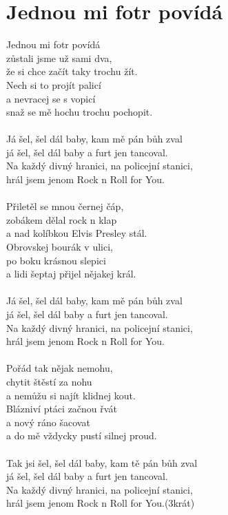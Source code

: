 \section{Jednou mi fotr povídá}
Jednou mi fotr povídá\\
zůstali jsme už sami dva,\\
že si chce začít taky trochu žít.\\
Nech si to projít palicí\\
a nevracej se s vopicí\\
snaž se mě hochu trochu pochopit.\\
\\
Já šel, šel dál baby, kam mě pán bůh zval\\
já šel, šel dál baby a furt jen tancoval.\\
Na každý divný hranici, na policejní stanici,\\
hrál jsem jenom Rock n Roll for You.\\
\\
Přiletěl se mnou černej čáp,\\
zobákem dělal rock n klap\\
a nad kolíbkou Elvis Presley stál.\\
Obrovskej bourák v ulici,\\
po boku krásnou slepici\\
a lidi šeptaj přijel nějakej král.\\
\\
Já šel, šel dál baby, kam mě pán bůh zval\\
já šel, šel dál baby a furt jen tancoval.\\
Na každý divný hranici, na policejní stanici,\\
hrál jsem jenom Rock n Roll for You.\\
\\
Pořád tak nějak nemohu,\\
chytit štěstí za nohu\\
a nemůžu si najít klidnej kout.\\
Blázniví ptáci začnou řvát\\
a nový ráno šacovat\\
a do mě vždycky pustí silnej proud.\\
\\
Tak jsi šel, šel dál baby, kam tě pán bůh zval\\
já šel, šel dál baby a furt jen tancoval.\\
Na každý divný hranici, na policejní stanici,\\
hrál jsem jenom Rock n Roll for You.(3krát)\\